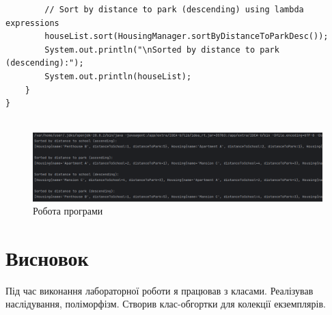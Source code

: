 \documentclass[14pt]{extreport}
\begin{document}
\begin{normalsize}
\begin{lstlisting}
		// Sort by distance to park (descending) using lambda expressions
		houseList.sort(HousingManager.sortByDistanceToParkDesc());
		System.out.println("\nSorted by distance to park (descending):");
		System.out.println(houseList);
	}
}
		

	\end{lstlisting}	
	
	\begin{figure}[H]
		\centering
		\includegraphics[scale=0.4]{1}
		\caption{Робота програми}
	\end{figure}

	\section*{Висновок}
	Під час виконання лабораторної роботи я працював з класами. Реалізував наслідування, поліморфізм. Створив клас-обгортки для
	колекції екземплярів.
	 
\end{normalsize}
\end{document}
